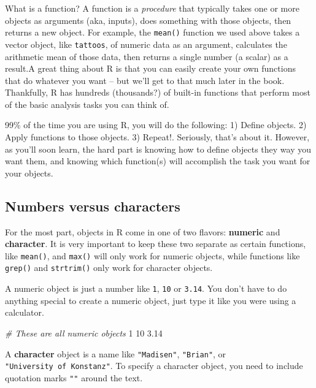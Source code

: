 \documentclass[
]{book}
\newenvironment{Shaded}{\begin{snugshade}}{\end{snugshade}}
\newcommand{\CommentTok}[1]{\textcolor[rgb]{0.56,0.35,0.01}{\textit{#1}}}
\newcommand{\DecValTok}[1]{\textcolor[rgb]{0.00,0.00,0.81}{#1}}
\newcommand{\FloatTok}[1]{\textcolor[rgb]{0.00,0.00,0.81}{#1}}
\begin{document}
What is a function? A function is a \emph{procedure} that typically takes one or more objects as arguments (aka, inputs), does something with those objects, then returns a new object. For example, the \texttt{mean()} function we used above takes a vector object, like \texttt{tattoos}, of numeric data as an argument, calculates the arithmetic mean of those data, then returns a single number (a scalar) as a result.A great thing about R is that you can easily create your own functions that do whatever you want -- but we'll get to that much later in the book. Thankfully, R has hundreds (thousands?) of built-in functions that perform most of the basic analysis tasks you can think of.

99\% of the time you are using R, you will do the following: 1) Define objects. 2) Apply functions to those objects. 3) Repeat!. Seriously, that's about it. However, as you'll soon learn, the hard part is knowing how to define objects they way you want them, and knowing which function(s) will accomplish the task you want for your objects.

\hypertarget{numbers-versus-characters}{%
\subsection{Numbers versus characters}\label{numbers-versus-characters}}

For the most part, objects in R come in one of two flavors: \textbf{numeric} and \textbf{character}. It is very important to keep these two separate as certain functions, like \texttt{mean()}, and \texttt{max()} will only work for numeric objects, while functions like \texttt{grep()} and \texttt{strtrim()} only work for character objects.

A numeric object is just a number like \texttt{1}, \texttt{10} or \texttt{3.14}. You don't have to do anything special to create a numeric object, just type it like you were using a calculator.

\begin{Shaded}
\begin{Highlighting}[]
\CommentTok{# These are all numeric objects}
\DecValTok{1}
\DecValTok{10}
\FloatTok{3.14}
\end{Highlighting}
\end{Shaded}

A \textbf{character} object is a name like \texttt{"Madisen"}, \texttt{"Brian"}, or \texttt{"University\ of\ Konstanz"}. To specify a character object, you need to include quotation marks \texttt{""} around the text.
\end{document}
